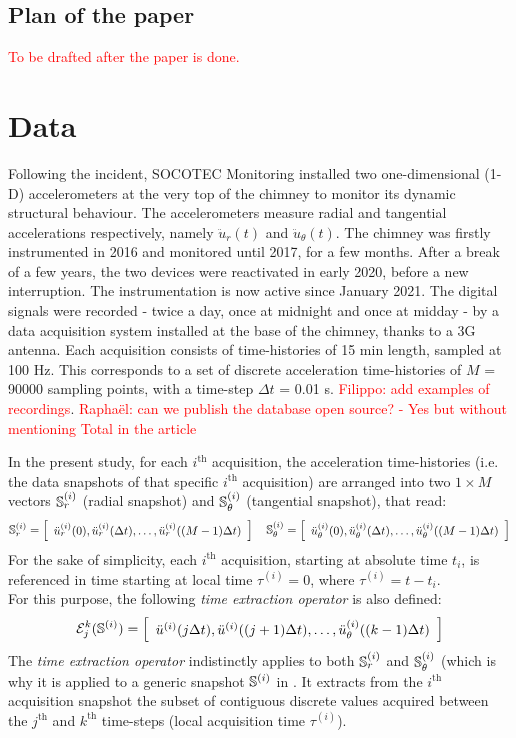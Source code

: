 \documentclass[runningheads]{llncs}
\begin{document}
\subsection{Plan of the paper}
\label{subsec:plan_of_the_paper}
\textcolor{red}{To be drafted after the paper is done.}

\section{Data}
\label{sec:Data}
Following the incident, SOCOTEC Monitoring installed two one-dimensional (1-D) accelerometers at the very top of the chimney to monitor its dynamic structural behaviour. The accelerometers measure radial and tangential accelerations respectively, namely $\ddot{u}_r(t)$ and $\ddot{u}_\theta(t)$. The chimney was firstly instrumented in 2016 and monitored until 2017, for a few months. After a break of a few years, the two devices were reactivated in early 2020, before a new interruption. The instrumentation is now active since January 2021. The digital signals were recorded - twice a day, once at midnight and once at midday - by a data acquisition system installed at the base of the chimney, thanks to a 3G antenna. Each acquisition consists of time-histories of 15 min length, sampled at 100 Hz. This corresponds to a set of discrete acceleration time-histories of $M$ = 90000 sampling points, with a time-step $\Delta t$ = 0.01 s. \textcolor{red}{Filippo: add examples of recordings}.
\textcolor{red}{Raphaël: can we publish the database open source? - Yes but without mentioning Total in the article}


In the present study, for each $i^\text{th}$ acquisition, the acceleration time-histories (i.e. the data snapshots of that specific $i^\text{th}$ acquisition) are arranged into two $1\times M$ vectors $\St[r][(i)]$ (radial snapshot) and $\St[\theta][(i)]$ (tangential snapshot), that read:
$$\St[r][(i)]=\bmat[\ddot{u}^{(i)}_r(0),\ddot{u}^{(i)}_r(\Delta t),\ldots ,\ddot{u}^{(i)}_r((M-1)\Delta t)][cccc] \quad \St[\theta][(i)]=\bmat[\ddot{u}^{(i)}_\theta(0),\ddot{u}^{(i)}_\theta(\Delta t),\ldots ,\ddot{u}^{(i)}_\theta((M-1)\Delta t)][cccc]$$
For the sake of simplicity, each $i^{\text{th}}$ acquisition, starting at absolute time $t_i$, is referenced in time starting at local time $\tau^{(i)}=0$, where $\tau^{(i)}=t-t_i$.\\ For this purpose, the following \textit{time extraction operator} is also defined:
\begin{equation}
    \label{eq:time_extracion}
    \mathcal{E}_j^k(\St[][(i)]) = \bmat[\ddot{u}^{(i)}(j\Delta t),\ddot{u}^{(i)}((j+1)\Delta t),\ldots ,\ddot{u}^{(i)}_\theta((k-1)\Delta t)][cccc]
\end{equation}
The \textit{time extraction operator} indistinctly applies to both $\St[r][(i)]$ and $\St[\theta][(i)]$ (which is why it is applied to a generic snapshot $\St[][(i)]$ in . It extracts from the $i^\text{th}$ acquisition snapshot the subset of contiguous discrete values acquired between the $j^\text{th}$ and $k^\text{th}$ time-steps (local acquisition time $\tau^{(i)}$).\\
\end{document}

